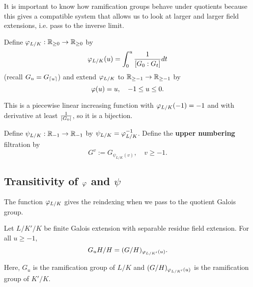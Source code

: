 It is important to know how ramification groups behave under quotients because this gives a compatible system that allows us to look at larger and larger field extensions, i.e. pass to the inverse limit.
\begin{df}
Define $\varphi_{L/K}:\mathbb{R}_{\ge 0}\to \mathbb{R}_{\ge 0}$ by
\[\varphi_{L/K}(u)=\int_0^u \frac{1}{[G_0:G_t]}dt\]
(recall $G_u=G_{\left\lceil {u}\right\rceil}$) and extend $\varphi_{L/K}$ to $\mathbb{R}_{\ge -1}\to \mathbb{R}_{\ge -1}$ by
\[\varphi(u)=u, \quad -1\le u\le 0.\]
\end{df}
This is a piecewise linear increasing function with $\varphi_{L/K}(-1)=-1$ and with derivative at least $\frac{1}{|G_0|}$, so it is a bijection.
\begin{df}
Define $\psi_{L/K}:\mathbb{R}_{-1}\to \mathbb{R}_{-1}$ by $\psi_{L/K}=\varphi_{L/K}^{-1}$. Define the \textbf{upper numbering} filtration by
\[
G^v :=G_{\psi_{L/K}(v)},\quad v\ge -1.
\]
\end{df}
\subsection{Transitivity of $\varphi$ and $\psi$}
The function $\varphi_{L/K}$ gives the reindexing when we pass to the quotient Galois group.
\begin{thm}
Let $L/K'/K$ be finite Galois extension with separable residue field extension.
For all $u\ge -1$, 
\[
G_uH/H=(G/H)_{\varphi_{L/K'}(u)}.
\]
\end{thm}
Here, $G_u$ is the ramification group of $L/K$ and $(G/H)_{\varphi_{L/K'}(u)}$ is the ramification group of $K'/K$. 

